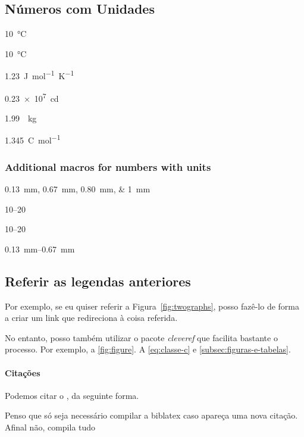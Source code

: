     \subsection*{Números com Unidades}

    \qty{10}{\celsius} \par
    \qty{10}{\degreeCelsius} \par
    \qty{1.23}{J.mol^{-1}.K^{-1}} \par
    \qty{.23e7}{\candela} \par
    \qty[per-mode = symbol]{1.99}{\per\kilogram} \par
    \qty[per-mode = fraction]{1,345}{\coulomb\per\mole}

    \pagebreak

    \subsubsection*{Additional macros for numbers with units}

    \qtylist{0.13;0.67;0.80;1}{\milli\metre}\par
     \par
     \par
    \numrange{10}{20} \par
    \numrange[range-phrase=--]{10}{20} \par
    \qtyrange{0.13}{0.67}{\milli\metre}

    \subsection{Referir as legendas anteriores}\label{subsec:reference}

    Por exemplo, se eu quiser referir a Figura~\ref{fig:twographs}, posso fazê-lo de forma a criar um link que redireciona à coisa referida.

    No entanto, posso também utilizar o pacote \emph{cleveref} que facilita bastante o processo.
    Por exemplo, a \cref{fig:figure}.
    A \cref{eq:classe-c} e \cref{subsec:figuras-e-tabelas}.

\paragraph{Citações} Podemos citar o \textcite{einstein}, da seguinte forma.

Penso que só seja necessário compilar a biblatex caso apareça uma nova citação.
Afinal não, compila tudo